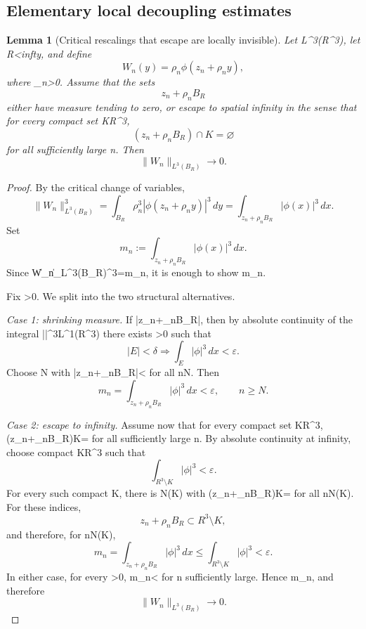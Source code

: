 \documentclass[11pt]{amsart}
\def\({}%
\def\){}%
\def\mathbb#1{#1}%
\def\infty{infty}%
\theoremstyle{plain}
\newtheorem{lemma}[lemma]{Lemma}
\theoremstyle{definition}
\theoremstyle{remark}
\begin{document}
\subsection{Elementary local decoupling estimates}

\begin{lemma}[Critical rescalings that escape are locally invisible]\label{paper3:lem:escaping-l3}
Let \(\phi\in L^3(\mathbb R^3)\), let \(R<\infty\), and define
\[
  W_n(y)=\rho_n\phi(z_n+\rho_n y),
\]
where \(\rho_n>0\).  Assume that the sets
\[
  z_n+\rho_nB_R
\]
either have measure tending to zero, or escape to spatial infinity in the sense
that for every compact set \(K\subset\mathbb R^3\),
\[
  (z_n+\rho_nB_R)\cap K=\varnothing
\]
for all sufficiently large \(n\).  Then
\[
  \|W_n\|_{L^3(B_R)}\to0.
\]
\end{lemma}

\begin{proof}
By the critical change of variables,
\[
  \|W_n\|_{L^3(B_R)}^3
  =\int_{B_R}\rho_n^3|\phi(z_n+\rho_n y)|^3\,dy
  =\int_{z_n+\rho_n B_R}|\phi(x)|^3\,dx.
\]
Set
\[
  m_n:=\int_{z_n+\rho_n B_R}|\phi(x)|^3\,dx.
\]
Since \(\|W_n\|_{L^3(B_R)}^3=m_n\), it is enough to show \(m_n\).
\par
Fix \(\varepsilon>0\).  We split into the two structural alternatives.

\smallskip
\noindent\textit{Case 1: shrinking measure.}
If \(|z_n+\rho_nB_R|\), then by absolute continuity of the integral
\(|\phi|^3\in L^1(\mathbb R^3)\) there exists \(\delta>0\) such that
\[
  |E|<\delta\Longrightarrow \int_E|\phi|^3\,dx<\varepsilon.
\]
Choose \(N\) with \(|z_n+\rho_nB_R|<\delta\) for all \(n\ge N\).  Then
\[
  m_n=\int_{z_n+\rho_nB_R}|\phi|^3\,dx<\varepsilon,\qquad n\ge N.
\]

\smallskip
\noindent\textit{Case 2: escape to infinity.}
Assume now that for every compact set \(K\subset\mathbb R^3\),
\((z_n+\rho_nB_R)\cap K=\varnothing\) for all sufficiently large \(n\).  By
absolute continuity at infinity, choose compact \(K\subset\mathbb R^3\) such that
\[
  \int_{\mathbb R^3\setminus K}|\phi|^3<\varepsilon.
\]
For every such compact \(K\), there is \(N(K)\) with
\((z_n+\rho_nB_R)\cap K=\varnothing\) for all \(n\ge N(K)\).  For these
indices,
\[
  z_n+\rho_nB_R \subset \mathbb R^3\setminus K,
\]
and therefore, for \(n\ge N(K)\),
\[
  m_n=\int_{z_n+\rho_nB_R}|\phi|^3\,dx
  \le
  \int_{\mathbb R^3\setminus K}|\phi|^3
  <\varepsilon.
\]
In either case, for every \(\varepsilon>0\), \(m_n<\varepsilon\) for \(n\) sufficiently
large.  Hence \(m_n\), and therefore
\[
  \|W_n\|_{L^3(B_R)}\to0.
\]
\end{proof}
\end{document}
